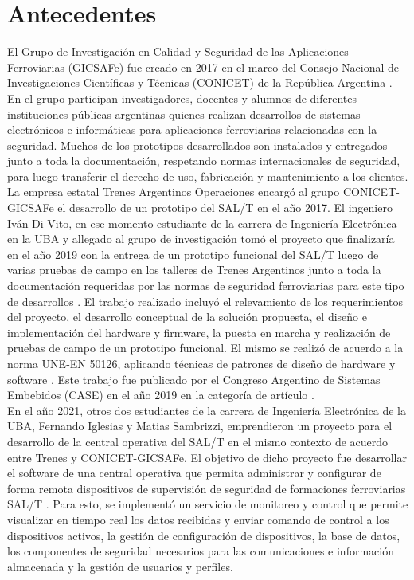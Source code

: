 \section{Antecedentes}

El Grupo de Investigación en Calidad y Seguridad de las Aplicaciones Ferroviarias (GICSAFe) fue creado en 2017 en el marco del Consejo Nacional de Investigaciones Científicas y Técnicas (CONICET) de la República Argentina \cite{gicasfe}. En el grupo participan investigadores, docentes y alumnos de diferentes instituciones públicas argentinas quienes realizan desarrollos de sistemas electrónicos e informáticas para aplicaciones ferroviarias relacionadas con la seguridad. Muchos de los prototipos desarrollados son instalados y entregados junto a toda la documentación, respetando normas internacionales de seguridad, para luego transferir el derecho de uso, fabricación y mantenimiento a los clientes. \\

La empresa estatal Trenes Argentinos Operaciones \cite{trenes_arg} encargó al grupo CONICET-GICSAFe el desarrollo de un prototipo del SAL/T en el año 2017. El ingeniero Iván Di Vito, en ese momento estudiante de la carrera de Ingeniería Electrónica en la UBA y allegado al grupo de investigación tomó el proyecto que finalizaría en el año 2019 con la entrega de un prototipo funcional del SAL/T luego de varias pruebas de campo en los talleres de Trenes Argentinos junto a toda la documentación requeridas por las normas de seguridad ferroviarias para este tipo de desarrollos \cite{salt_ivan}. El trabajo realizado incluyó el relevamiento de los requerimientos del proyecto, el desarrollo conceptual de la solución propuesta, el diseño e implementación del hardware y firmware, la puesta en marcha y realización de pruebas de campo de un prototipo funcional. El mismo se realizó de acuerdo a la norma UNE-EN 50126, aplicando técnicas de
patrones de diseño de hardware y software \cite{patrones}. Este trabajo fue publicado por el Congreso Argentino de Sistemas Embebidos (CASE) en el año 2019 en la categoría de artículo \cite{salt_case}. \\

En el año 2021, otros dos estudiantes de la carrera de Ingeniería Electrónica de la UBA, Fernando Iglesias y Matias Sambrizzi, emprendieron un proyecto para el desarrollo de la central operativa del SAL/T en el mismo contexto  de acuerdo entre Trenes y CONICET-GICSAFe. El objetivo de dicho proyecto fue desarrollar el software de una central operativa que permita administrar y configurar
de forma remota dispositivos de supervisión de seguridad de formaciones ferroviarias SAL/T \cite{central_op}. Para esto, se implementó un servicio de monitoreo y control que permite visualizar en tiempo real los datos recibidas y enviar comando de control a los dispositivos activos, la gestión de configuración de dispositivos, la base de datos, los componentes de seguridad necesarios para las comunicaciones e información almacenada y la gestión de usuarios y perfiles. \\
